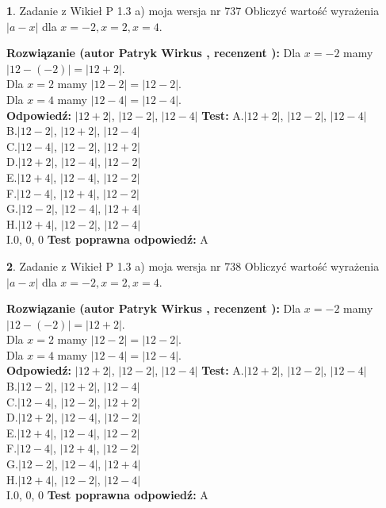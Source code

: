 \documentclass[12pt, a4paper]{article}
\theoremstyle{definition} %
\newtheorem{zad}{}
\newcommand{\zadStart}[1]{\begin{zad}#1\newline}
\newcommand{\zadStop}{\end{zad}}
\newcommand{\rozwStart}[2]{\noindent \textbf{Rozwiązanie (autor #1 , recenzent #2): }\newline}
\newcommand{\rozwStop}{\newline}
\newcommand{\odpStart}{\noindent \textbf{Odpowiedź:}\newline}
\newcommand{\odpStop}{\newline}
\newcommand{\testStart}{\noindent \textbf{Test:}\newline}
\newcommand{\testStop}{\newline}
\newcommand{\kluczStart}{\noindent \textbf{Test poprawna odpowiedź:}\newline}
\newcommand{\kluczStop}{\newline}
\begin{document}
\zadStart{Zadanie z Wikieł P 1.3 a) moja wersja nr 737}
Obliczyć wartość wyrażenia $|a - x|$ dla $x=-2,x=2,x=4$.
\zadStop
\rozwStart{Patryk Wirkus}{}
Dla $x = -2$ mamy $|12 - (-2)| = |12 + 2|$.\\
Dla $x = 2$ mamy $|12 - 2| = |12 - 2|$.\\
Dla $x = 4$ mamy $|12 - 4| = |12 - 4|$.\\
\rozwStop
\odpStart
$|12 + 2|$, $|12 - 2|$, $|12 - 4|$
\odpStop
\testStart
A.$|12 + 2|$, $|12 - 2|$, $|12 - 4|$\\
B.$|12 - 2|$, $|12 + 2|$, $|12 - 4|$\\
C.$|12 - 4|$, $|12 - 2|$, $|12 + 2|$\\
D.$|12 + 2|$, $|12 - 4|$, $|12 - 2|$\\
E.$|12 + 4|$, $|12 - 4|$, $|12 - 2|$\\
F.$|12 - 4|$, $|12 + 4|$, $|12 - 2|$\\
G.$|12 - 2|$, $|12 - 4|$, $|12 + 4|$\\
H.$|12 + 4|$, $|12 - 2|$, $|12 - 4|$\\
I.$0$, $0$, $0$
\testStop
\kluczStart
A
\kluczStop



\zadStart{Zadanie z Wikieł P 1.3 a) moja wersja nr 738}
Obliczyć wartość wyrażenia $|a - x|$ dla $x=-2,x=2,x=4$.
\zadStop
\rozwStart{Patryk Wirkus}{}
Dla $x = -2$ mamy $|12 - (-2)| = |12 + 2|$.\\
Dla $x = 2$ mamy $|12 - 2| = |12 - 2|$.\\
Dla $x = 4$ mamy $|12 - 4| = |12 - 4|$.\\
\rozwStop
\odpStart
$|12 + 2|$, $|12 - 2|$, $|12 - 4|$
\odpStop
\testStart
A.$|12 + 2|$, $|12 - 2|$, $|12 - 4|$\\
B.$|12 - 2|$, $|12 + 2|$, $|12 - 4|$\\
C.$|12 - 4|$, $|12 - 2|$, $|12 + 2|$\\
D.$|12 + 2|$, $|12 - 4|$, $|12 - 2|$\\
E.$|12 + 4|$, $|12 - 4|$, $|12 - 2|$\\
F.$|12 - 4|$, $|12 + 4|$, $|12 - 2|$\\
G.$|12 - 2|$, $|12 - 4|$, $|12 + 4|$\\
H.$|12 + 4|$, $|12 - 2|$, $|12 - 4|$\\
I.$0$, $0$, $0$
\testStop
\kluczStart
A
\kluczStop
\end{document}
